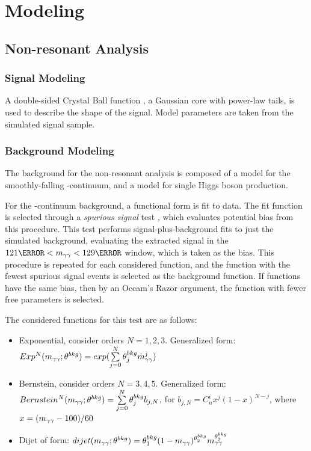 \section{Modeling}



\subsection{Non-resonant Analysis}
\subsubsection{Signal Modeling}

A double-sided Crystal Ball function \cite{dscb-diphoton}, a Gaussian core with power-law tails, is used to describe the shape of the \hhyybb signal. Model parameters are taken from the simulated signal sample.

\subsubsection{Background Modeling} \label{sssec:nonres-bkg-model}

The background for the non-resonant analysis is composed of a model for the smoothly-falling \yy-continuum, and a model for single Higgs boson production. 


For the \yy-continuum background, a functional form is fit to data. The fit function is selected through a \textit{spurious signal} test \cite{spurious-signal-diphoton}, which evaluates potential bias from this procedure. This test performs signal-plus-background fits to just the simulated background, evaluating the extracted signal in the $\unit{121}{\GeV} < \myy < \unit{129}{\GeV}$ window, which is taken as the bias. This procedure is repeated for each considered function, and the function with the fewest spurious signal events is selected as the background function. If functions have the same bias, then by an Occam's Razor argument, the function with fewer free parameters is selected.

The considered functions for this test are as follows:
\begin{itemize}
  \item Exponential, consider orders $N=1,2,3$. Generalized form: $Exp^N (m_{\gamma\gamma} ; \theta^{bkg}) = exp(\sum\limits_{j=0}^{N} \theta_j^{bkg} \dot m_{\gamma\gamma}^j)$
  \item Bernstein, consider orders $N=3,4,5$. Generalized form: $Bernstein^N (m_{\gamma\gamma} ; \theta^{bkg}) = \sum\limits_{j=0}^{N} \theta_j^{bkg} b_{j,N}$, for $b_{j,N} = C_n^i x^j (1-x)^{N-j}$, where $x= (m_{\gamma\gamma}-100)/60$
  \item Dijet of form: $dijet(m_{\gamma\gamma} ; \theta^{bkg}) = \theta_1^{bkg} (1-m_{\gamma\gamma})^{\theta_2^{bkg}} m_{\gamma\gamma}^{\theta_3^{bkg}}$
\end{itemize}

